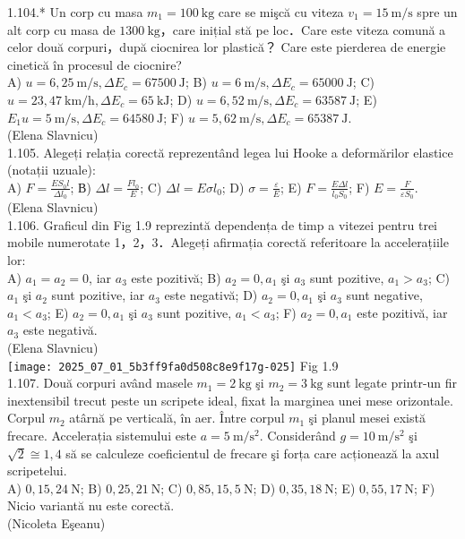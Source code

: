 1.104.* Un corp cu masa $m_{1}=100 \mathrm{~kg}$ care se mişcă cu viteza $v_{1}=15 \mathrm{~m} / \mathrm{s}$ spre un alt corp cu masa de $1300 \mathrm{~kg}$，care inițial stă pe loc．Care este viteza comună a celor două corpuri，după ciocnirea lor plastică？ Care este pierderea de energie cinetică în procesul de ciocnire?\\ A) $u=6,25 \mathrm{~m} / \mathrm{s}, \Delta E_{c}=67500 \mathrm{~J}$; B) $u=6 \mathrm{~m} / \mathrm{s}, \Delta E_{c}=65000 \mathrm{~J}$; C) $u=23,47 \mathrm{~km} / \mathrm{h}, \Delta E_{c}=65 \mathrm{~kJ}$; D) $u=6,52 \mathrm{~m} / \mathrm{s}, \Delta E_{c}=63587 \mathrm{~J}$; E) $E_{1} u=5 \mathrm{~m} / \mathrm{s}, \Delta E_{c}=64580 \mathrm{~J}$; F) $u=5,62 \mathrm{~m} / \mathrm{s}, \Delta E_{c}=65387 \mathrm{~J}$.\\ (Elena Slavnicu)\\

1.105. Alegeți relația corectă reprezentând legea lui Hooke a deformărilor elastice (notații uzuale):\\ A) $F=\frac{E S_{0} l}{\Delta l_{0}}$; В) $\Delta l=\frac{F l_{0}}{E}$; C) $\Delta l=E \sigma l_{0}$; D) $\sigma=\frac{\varepsilon}{E}$; E) $F=\frac{E \Delta l}{l_{0} S_{0}}$; F) $E=\frac{F}{\varepsilon S_{0}}$.\\ (Elena Slavnicu)\\

1.106. Graficul din Fig 1.9 reprezintă dependența de timp a vitezei pentru trei mobile numerotate 1，2，3．Alegeți afirmația corectă referitoare la accelerațiile lor:\\ A) $a_{1}=a_{2}=0$, iar $a_{3}$ este pozitivă; B) $a_{2}=0, a_{1}$ şi $a_{3}$ sunt pozitive, $a_{1}>a_{3}$; C) $a_{1}$ şi $a_{2}$ sunt pozitive, iar $a_{3}$ este negativă; D) $a_{2}=0, a_{1}$ şi $a_{3}$ sunt negative, $a_{1}<a_{3}$; E) $a_{2}=0, a_{1}$ şi $a_{3}$ sunt pozitive, $a_{1}<a_{3}$; F) $a_{2}=0, a_{1}$ este pozitivă, iar $a_{3}$ este negativă.\\ (Elena Slavnicu)\\ \texttt{[image: 2025\_07\_01\_5b3ff9fa0d508c8e9f17g-025]} Fig 1.9\\

1.107. Două corpuri având masele $m_{1}=2 \mathrm{~kg}$ şi $m_{2}=3 \mathrm{~kg}$ sunt legate printr-un fir inextensibil trecut peste un scripete ideal, fixat la marginea unei mese orizontale. Corpul $m_{2}$ atârnă pe verticală, în aer. Între corpul $m_{1}$ şi planul mesei există frecare. Accelerația sistemului este $a=5 \mathrm{~m} / \mathrm{s}^{2}$. Considerând $g=10 \mathrm{~m} / \mathrm{s}^{2}$ şi $\sqrt{2} \cong 1,4$ să se calculeze coeficientul de frecare şi forța care acționează la axul scripetelui.\\ A) $0,15, 24 \mathrm{~N}$; B) $0,25, 21 \mathrm{~N}$; C) $0,85, 15,5 \mathrm{~N}$; D) $0,35, 18 \mathrm{~N}$; E) $0,55, 17 \mathrm{~N}$; F) Nicio variantă nu este corectă.\\ (Nicoleta Eşeanu)\\

